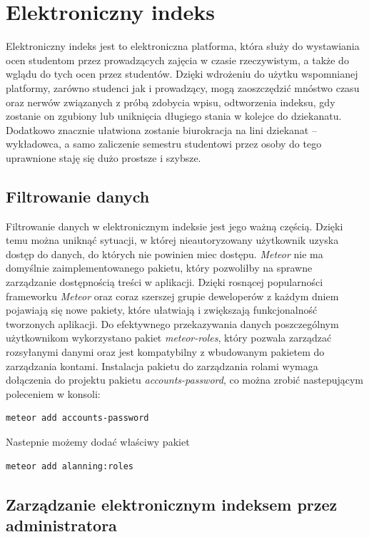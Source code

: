 \documentclass{xmgr}
\begin{document}
\chapter{Elektroniczny indeks}
Elektroniczny indeks jest to elektroniczna platforma, która służy do wystawiania ocen studentom przez prowadzących zajęcia w czasie rzeczywistym, a także do wglądu do tych ocen przez studentów. Dzięki wdrożeniu do użytku wspomnianej platformy, zarówno studenci jak i prowadzący, mogą zaoszczędzić mnóstwo czasu oraz nerwów związanych z próbą zdobycia wpisu, odtworzenia indeksu, gdy zostanie on zgubiony lub uniknięcia długiego stania w kolejce do dziekanatu. Dodatkowo znacznie ułatwiona zostanie biurokracja na lini dziekanat -- wykładowca, a samo zaliczenie semestru studentowi przez osoby do tego uprawnione staję się dużo prostsze i szybsze.

\section{Filtrowanie danych}

Filtrowanie danych w elektronicznym indeksie jest jego ważną częścią. Dzięki temu można uniknąć sytuacji, w której nieautoryzowany użytkownik uzyska dostęp do danych, do których nie powinien miec dostępu. \textit{Meteor} nie ma domyślnie zaimplementowanego pakietu, który pozwoliłby na sprawne zarządzanie dostępnością treści w aplikacji.  Dzięki rosnącej popularności frameworku \textit{Meteor} oraz coraz szerszej grupie deweloperów z każdym dniem pojawiają się nowe pakiety, które ułatwiają i zwiększają funkcjonalność tworzonych aplikacji. Do efektywnego przekazywania danych poszczególnym użytkownikom wykorzystano pakiet \textit{meteor-roles}, który pozwala zarządzać rozsyłanymi danymi oraz jest kompatybilny z wbudowanym pakietem do zarządzania kontami. Instalacja pakietu do zarządzania rolami wymaga dołączenia do projektu pakietu \textit{accounts-password}, co można zrobić nastepującym poleceniem w konsoli:
\newpage
\begin{lstlisting}[language=bash,caption={Instalacja accounts-password}]
	meteor add accounts-password
\end{lstlisting}

Nastepnie możemy dodać właściwy pakiet

\begin{lstlisting}[language=bash,caption={Instalacja pakietu roles}]
	meteor add alanning:roles
\end{lstlisting}


\section{Zarządzanie elektronicznym indeksem przez administratora}
\end{document}
